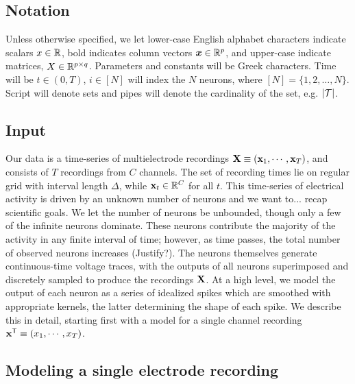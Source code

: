 

\subsection{Notation}

Unless otherwise specified, we let lower-case English alphabet characters indicate scalars $x \in \mathbb{R}$, bold indicates column vectors $\boldsymbol{x} \in \mathbb{R}^p$, and upper-case indicate matrices, $X \in \mathbb{R}^{p \times q}$.  Parameters and constants will be Greek characters.  Time will be $t \in (0,T)$, $i \in [N]$ will index the $N$ neurons, where $[N]=\{1,2,\ldots,N\}$. Script will denote sets and pipes will denote the cardinality of the set, e.g. $|\mathcal{T}|$.  

\subsection{Input}
Our data is a time-series of multielectrode recordings $\mathbf{X} \equiv (\mathbf{x}_1, \cdots, \mathbf{x}_T)$, and consists of $T$ recordings from $C$ channels. 
The set of recording times lie on regular grid with interval length $\Delta$, while $\mathbf{x}_t \in \mathbb{R}^C$ for all $t$. 
This time-series of electrical activity is driven by an unknown number of neurons {\color{red} and we want to... recap scientific goals}. 
We let the number of neurons be unbounded, though only a few of the infinite
neurons dominate. These neurons contribute the majority of the activity in any finite interval of time; however, as time passes, the total number of 
observed neurons increases {\color{red}(Justify?)}. 
The neurons themselves generate continuous-time voltage traces, with the outputs of all neurons superimposed and discretely sampled to produce the 
recordings $\mathbf{X}$.  At a high level, we model the output of each neuron as a
series of idealized spikes which are smoothed with appropriate kernels, the latter determining the shape of each spike. 
We describe this in detail, starting first with a model for a single channel recording $\mathbf{x}^{\mathsf{T}} \equiv (x_1, \cdots, x_T)$.

\subsection{Modeling a single electrode recording}

